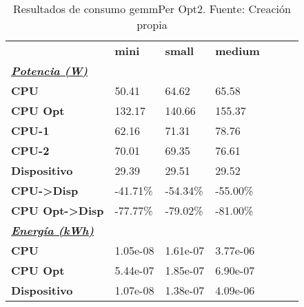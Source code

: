 \begin{table}[H]
    \centering
    \begin{tabular}{lllllll}
    \rowcolor[HTML]{DAE8FC} \ & \textbf{mini} & \textbf{	small} & \textbf{	medium} \\
    \cellcolor[HTML]{DAE8FC} \textbf{\textbf{{\emph{{\underline{{Potencia (W)}}}}}}} &  & 	 & 	 \\
    \rowcolor[HTML]{EFEFEF} \cellcolor[HTML]{DAE8FC} \textbf{CPU} & 50.41 & 	64.62 & 	65.58 \\
    \cellcolor[HTML]{DAE8FC} \textbf{CPU Opt} & 132.17 & 	140.66 & 	155.37 \\
    \rowcolor[HTML]{EFEFEF} \cellcolor[HTML]{DAE8FC} \textbf{\quad CPU-1} & 62.16 & 	71.31 & 	78.76 \\
    \cellcolor[HTML]{DAE8FC} \textbf{\quad CPU-2} & 70.01 & 	69.35 & 	76.61 \\
    \rowcolor[HTML]{EFEFEF} \cellcolor[HTML]{DAE8FC} \textbf{Dispositivo} & 29.39 & 	29.51 & 	29.52 \\
    \cellcolor[HTML]{DAE8FC} \textbf{CPU->Disp} & -41.71\% & 	-54.34\% & 	-55.00\% \\
    \rowcolor[HTML]{EFEFEF} \cellcolor[HTML]{DAE8FC} \textbf{CPU Opt->Disp} & -77.77\% & 	-79.02\% & 	-81.00\% \\
    \cellcolor[HTML]{DAE8FC} \textbf{\textbf{{\emph{{\underline{{Energía (kWh)}}}}}}} &  & 	 & 	 \\
    \rowcolor[HTML]{EFEFEF} \cellcolor[HTML]{DAE8FC} \textbf{CPU} & 1.05e-08 & 	1.61e-07 & 	3.77e-06 \\
    \cellcolor[HTML]{DAE8FC} \textbf{CPU Opt} & 5.44e-07 & 	1.85e-07 & 	6.90e-07 \\
    \rowcolor[HTML]{EFEFEF} \cellcolor[HTML]{DAE8FC} \textbf{Dispositivo} & 1.07e-08 & 	1.38e-07 & 	4.09e-06 \\
    \end{tabular}
    \caption[Resultados de consumo gemmPer Opt2]{{Resultados de consumo gemmPer Opt2. Fuente: Creación propia}}
    \label{table_test_gemmPer_Opt2_hw_powerResults}
\end{table}